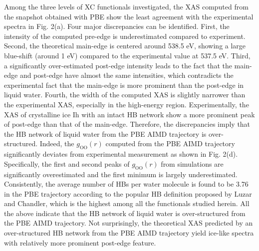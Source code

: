 \documentclass[prb,twocolumn,showpacs,preprintnumbers,superscriptaddress,amsmath,amssymb]{revtex4}
\begin{document}
Among the three levels of XC functionals investigated,
the XAS computed from the snapshot obtained with PBE show the least agreement with the experimental spectra in Fig. 2(a).
Four major discrepancies can be identified. First, the intensity of the computed pre-edge is
underestimated compared to experiment.
Second, the theoretical main-edge is centered around 538.5 eV, showing a large blue-shift (around 1 eV)
compared to the experimental value at 537.5 eV.
Third, a significantly over-estimated post-edge intensity leads to the fact
that the main-edge and post-edge have almost the same intensities,
which contradicts the experimental fact that the main-edge is more prominent than the post-edge in liquid water.
Fourth, the width of the computed XAS is slightly narrower than the experimental XAS, especially in the high-energy region.
Experimentally, the XAS of crystalline ice Ih with an intact HB network show a more prominent peak of post-edge than that of the main-edge.
Therefore, the discrepancies imply that the HB network of liquid water from the PBE AIMD trajectory
is over-structured.
Indeed, the $g_{\mathrm{OO}}(r)$ computed from the PBE AIMD trajectory significantly
deviates from experimental measurement\cite{skinner2013benchmark} as shown in Fig. 2(d).
Specifically, the first and second peaks of $g_{\mathrm{OO}}(r)$ from simulations are
significantly overestimated and the first minimum is largely underestimated.
Consistently, the average number of HBs per water molecule is found to be 3.76 in the PBE trajectory
according to the popular HB definition proposed by Luzar and Chandler,\cite{luzar1996effect}
which is the highest among all the functionals studied herein.
All the above indicate that the HB network of liquid water is
over-structured from the PBE AIMD trajectory.
Not surprisingly, the theoretical XAS predicted by an over-structured HB network from the PBE AIMD trajectory
yield ice-like spectra with relatively more prominent post-edge feature.
\end{document}
